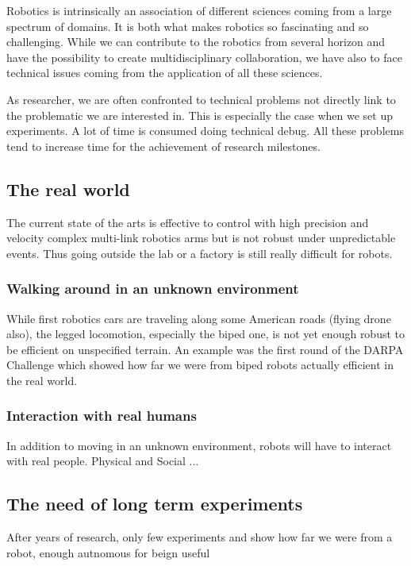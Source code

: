 Robotics is intrinsically an association of different sciences coming from a large spectrum of domains. It is both what makes robotics so fascinating and so challenging. While we can contribute to the robotics from several horizon and have the possibility to create multidisciplinary collaboration, we have also to face technical issues coming from the application of all these sciences.

As researcher, we  are often confronted to technical problems not directly link to the problematic we are interested in. This is especially the case when we set up experiments. A lot of time is consumed doing technical debug. All these problems tend to increase time for the achievement of research milestones.


\subsection{The real world} %

The current state of the arts is effective to control with high precision and velocity complex multi-link robotics arms but is not robust under unpredictable events. Thus going outside the lab or a factory is still really difficult for robots.

\subsubsection{Walking around in an unknown environment} %
While first robotics cars are traveling along some American roads (flying drone also), the legged locomotion, especially the biped one, is not yet enough robust to be efficient on unspecified terrain. An example was the first round of the DARPA Challenge which showed how far we were from biped robots actually efficient in the real world.


\subsubsection{Interaction with real humans} %
In addition to moving in an unknown environment, robots will have to interact with real people.
Physical and Social ...


\subsection{The need of long term experiments} %
After years of research, only few experiments and show how far we were from a robot, enough autnomous for beign useful



